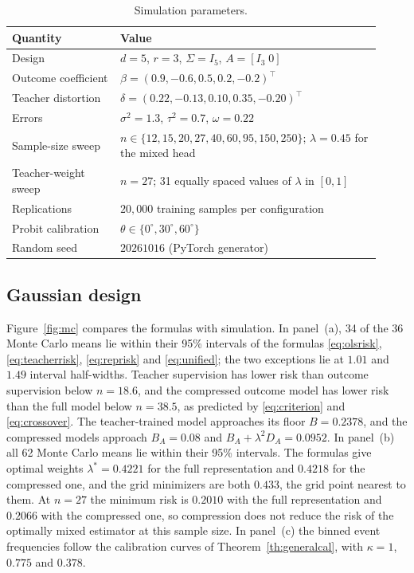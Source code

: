 \documentclass[11pt]{article}
\theoremstyle{remark}
\newcommand{\1}{\mathbf 1}
\begin{document}
\begin{table}[ht]
\centering\small
\caption{Simulation parameters.}\label{tab:params}
\begin{tabular}{p{0.27\linewidth}p{0.65\linewidth}}
\toprule
Quantity & Value \\
\midrule
Design & $d=5$, $r=3$, $\Sigma=I_5$, $A=[I_3\;0]$ \\
Outcome coefficient & $\beta=(0.9,-0.6,0.5,0.2,-0.2)^\top$ \\
Teacher distortion & $\delta=(0.22,-0.13,0.10,0.35,-0.20)^\top$ \\
Errors & $\sigma^2=1.3$, $\tau^2=0.7$, $\omega=0.22$ \\
Sample-size sweep & $n\in\{12,15,20,27,40,60,95,150,250\}$; $\lambda=0.45$ for the mixed head \\
Teacher-weight sweep & $n=27$; 31 equally spaced values of $\lambda$ in $[0,1]$ \\
Replications & $20{,}000$ training samples per configuration \\
Probit calibration & $\theta\in\{0^\circ,30^\circ,60^\circ\}$ \\
Random seed & $20261016$ (PyTorch generator) \\
\bottomrule
\end{tabular}
\end{table}

\subsection{Gaussian design}
Figure~\ref{fig:mc} compares the formulas with simulation. In panel~(a), 34 of the 36 Monte Carlo means lie within their 95\% intervals of the formulas \eqref{eq:olsrisk}, \eqref{eq:teacherrisk}, \eqref{eq:reprisk} and \eqref{eq:unified}; the two exceptions lie at $1.01$ and $1.49$ interval half-widths. Teacher supervision has lower risk than outcome supervision below $n=18.6$, and the compressed outcome model has lower risk than the full model below $n=38.5$, as predicted by \eqref{eq:criterion} and \eqref{eq:crossover}. The teacher-trained model approaches its floor $B=0.2378$, and the compressed models approach $B_A=0.08$ and $B_A+\lambda^2D_A=0.0952$. In panel~(b) all 62 Monte Carlo means lie within their 95\% intervals. The formulas give optimal weights $\lambda^*=0.4221$ for the full representation and $0.4218$ for the compressed one, and the grid minimizers are both $0.433$, the grid point nearest to them. At $n=27$ the minimum risk is $0.2010$ with the full representation and $0.2066$ with the compressed one, so compression does not reduce the risk of the optimally mixed estimator at this sample size. In panel~(c) the binned event frequencies follow the calibration curves of Theorem~\ref{th:generalcal}, with $\kappa=1$, $0.775$ and $0.378$.
\end{document}
